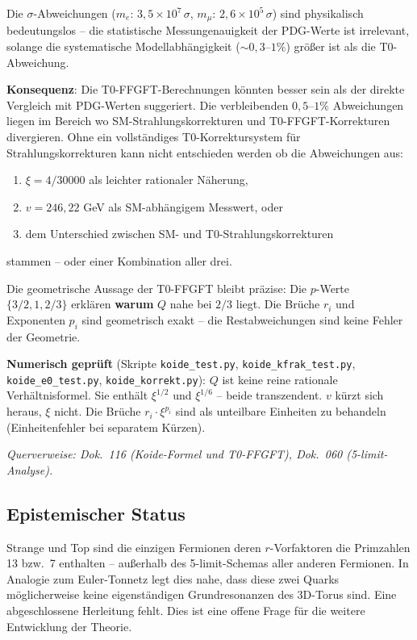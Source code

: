Die $\sigma$-Abweichungen ($m_e$: $3{,}5 \times 10^{7}\,\sigma$,
$m_\mu$: $2{,}6 \times 10^5\,\sigma$) sind physikalisch bedeutungslos
-- die statistische Messungenauigkeit der PDG-Werte ist irrelevant,
solange die systematische Modellabhängigkeit ($\sim 0{,}3$--$1\%$)
größer ist als die T0-Abweichung.

\textbf{Konsequenz}: Die T0-FFGFT-Berechnungen könnten besser sein
als der direkte Vergleich mit PDG-Werten suggeriert. Die verbleibenden
$0{,}5$--$1\%$ Abweichungen liegen im Bereich wo SM-Strahlungs\-korrekturen
und T0-FFGFT-Korrekturen divergieren. Ohne ein vollständiges
T0-Korrektursystem für Strahlungskorrekturen kann nicht entschieden
werden ob die Abweichungen aus:
\begin{enumerate}
    \item $\xi = 4/30000$ als leichter rationaler Näherung,
    \item $v = 246{,}22$ GeV als SM-abhängigem Messwert, oder
    \item dem Unterschied zwischen SM- und T0-Strahlungskorrekturen
\end{enumerate}
stammen -- oder einer Kombination aller drei.

Die geometrische Aussage der T0-FFGFT bleibt präzise:
Die $p$-Werte $\{3/2, 1, 2/3\}$ erklären \textbf{warum} $Q$ nahe
bei $2/3$ liegt. Die Brüche $r_i$ und Exponenten $p_i$ sind
geometrisch exakt -- die Restabweichungen sind keine Fehler der
Geometrie.

\textbf{Numerisch geprüft} (Skripte \texttt{koide\_test.py},
\texttt{koide\_kfrak\_test.py}, \texttt{koide\_e0\_test.py},
\texttt{koide\_korrekt.py}):
$Q$ ist keine reine rationale Verhältnisformel. Sie enthält
$\xi^{1/2}$ und $\xi^{1/6}$ -- beide transzendent. $v$ kürzt sich
heraus, $\xi$ nicht. Die Brüche $r_i \cdot \xi^{p_i}$ sind als
unteilbare Einheiten zu behandeln (Einheitenfehler bei separatem Kürzen).

\noindent\textit{Querverweise: Dok.~116 (Koide-Formel und T0-FFGFT),
Dok.~060 (5-limit-Analyse).}

\subsection{Epistemischer Status}

\begin{predbox}
Strange und Top sind die einzigen Fermionen deren $r$-Vorfaktoren
die Primzahlen 13 bzw.\ 7 enthalten -- außerhalb des 5-limit-Schemas
aller anderen Fermionen. In Analogie zum Euler-Tonnetz legt dies
nahe, dass diese zwei Quarks möglicherweise keine eigenständigen
Grundresonanzen des 3D-Torus sind. Eine abgeschlossene Herleitung
fehlt. Dies ist eine offene Frage für die weitere Entwicklung der
Theorie.
\end{predbox}

